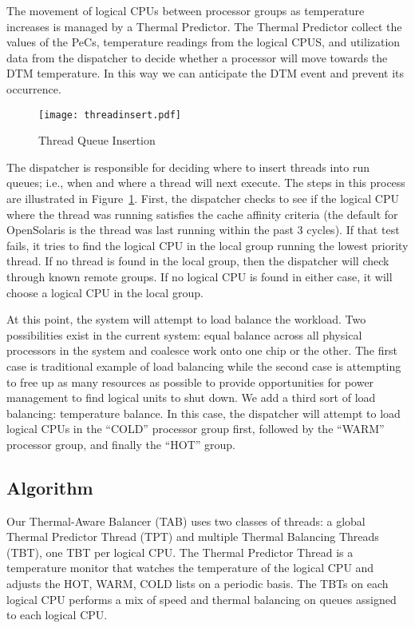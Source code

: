 The movement of logical CPUs between processor groups as temperature
increases is managed by a Thermal Predictor.  The Thermal Predictor
collect the values of the PeCs, temperature readings from the logical
CPUS, and utilization data from the dispatcher to decide whether a
processor will move towards the DTM temperature.  In this way we can
anticipate the DTM event and prevent its occurrence.

\begin{figure}[htbp]
  \centering
  \texttt{[image: threadinsert.pdf]}
  \caption{Thread Queue Insertion}
  \label{fig:thread}
\end{figure}
The dispatcher is responsible for deciding where to insert threads into
run queues; i.e., when and where a thread will next execute. The steps
in this process are illustrated in Figure~\ref{fig:thread}.  First, the
dispatcher checks to see if the logical CPU where the thread was running
satisfies the cache affinity criteria (the default for OpenSolaris is
the thread was last running within the past 3 cycles).  If that test
fails, it tries to find the logical CPU in the local group running the
lowest priority thread.  If no thread is found in the local group, then
the dispatcher will check through known remote groups.  If no logical
CPU is found in either case, it will choose a logical CPU in the local
group.

At this point, the system will attempt to load balance the workload.
Two possibilities exist in the current system: equal balance across all
physical processors in the system and coalesce work onto one chip or the
other.  The first case is traditional example of load balancing while
the second case is attempting to free up as many resources as possible
to provide opportunities for power management to find logical units to
shut down.  We add a third sort of load balancing: temperature
balance. In this case, the dispatcher will attempt to load logical CPUs
in the ``COLD'' processor group first, followed by the ``WARM''
processor group, and finally the ``HOT'' group.

\subsection{Algorithm}
\label{sec:lbalgorithm}
Our Thermal-Aware Balancer (TAB) uses two classes of threads: a global
Thermal Predictor Thread (TPT) and multiple Thermal Balancing Threads
(TBT), one TBT per logical CPU.   The Thermal Predictor Thread is a
temperature monitor that watches the temperature of the logical CPU and
adjusts the HOT, WARM, COLD lists on a periodic basis.  The TBTs on each
logical CPU performs a mix of speed and thermal balancing
\cite{Hofmeyr2010} on queues assigned to each logical CPU.

